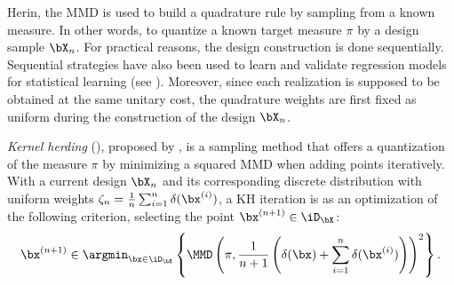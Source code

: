 Herin, the MMD is used to build a quadrature rule by sampling from a known measure. 
In other words, to quantize a known target measure $\pi$ by a design sample $\bX_n$. 
For practical reasons, the design construction is done sequentially. 
Sequential strategies have also been used to learn and validate regression models for statistical learning (see \citealp{fekhari_iooss_2023}). 
Moreover, since each realization is supposed to be obtained at the same unitary cost, the quadrature weights are first fixed as uniform during the construction of the design $\bX_n$.

\emph{Kernel herding} (), proposed by \cite{chen_welling_2010}, is a sampling method that offers a quantization of the measure $\pi$ by minimizing a squared MMD when adding points iteratively. 
With a current design $\bX_n$ and its corresponding discrete distribution with uniform weights $\zeta_n= \frac{1}{n} \sum_{i=1}^{n} \delta(\bx^{(i)})$, a KH iteration is as an optimization of the following criterion, selecting the point $\bx^{(n+1)} \in \iD_{\bX}$:
\begin{align}
   \bx^{(n+1)} \in \argmin_{\bx \in \iD_{\bX}} \left\{\MMD\left(\pi, \frac{1}{n+1} \left(\delta(\bx) + \sum_{i=1}^{n} \delta(\bx^{(i)})\right)\right)^2\right\}.
   \label{eq:mmd_criterion}
\end{align}

